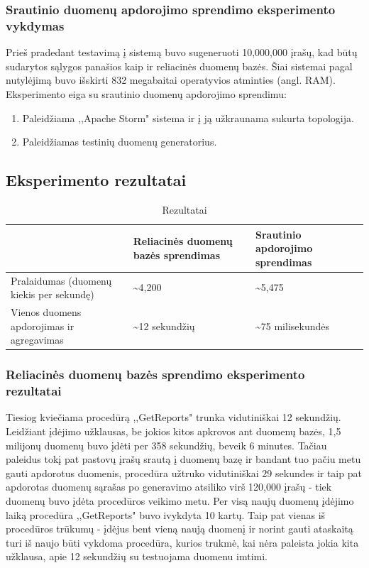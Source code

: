\documentclass{VUMIFPSkursinis}
\begin{document}
\subsubsection{Srautinio duomenų apdorojimo sprendimo eksperimento vykdymas}

Prieš pradedant testavimą į sistemą buvo sugeneruoti 10,000,000 įrašų, kad būtų sudarytos sąlygos panašios kaip ir reliacinės duomenų bazės.
Šiai sistemai pagal nutylėjimą buvo išskirti 832 megabaitai operatyvios atminties (angl. RAM). 
Eksperimento eiga su srautinio duomenų apdorojimo sprendimu:
\begin{enumerate} 
\item Paleidžiama ,,Apache Storm" sistema ir į ją užkraunama sukurta topologija.
\item Paleidžiamas testinių duomenų generatorius.
\end{enumerate}
\newpage
\subsection{Eksperimento rezultatai}
\begin{table}[!htbp]
    \begin{center}
        \caption{Rezultatai}
        \label{table:results}
        \begin{tabular}{ | l | p{4cm} | p{3cm} | } 
            \hline
              & Reliacinės duomenų bazės sprendimas & Srautinio apdorojimo sprendimas \\* \hline
            Pralaidumas (duomenų kiekis per sekundę) & \textasciitilde4,200 & \textasciitilde5,475 \\* \hline
            Vienos duomens apdorojimas ir agregavimas  & \textasciitilde12 sekundžių & \textasciitilde75 milisekundės\\* \hline
        \end{tabular}
    \end{center}
\end{table}\par
\subsubsection{Reliacinės duomenų bazės sprendimo eksperimento rezultatai}
Tiesiog kviečiama procedūrą ,,GetReports" trunka vidutiniškai 12 sekundžių. Leidžiant įdėjimo užklausas, be jokios kitos apkrovos ant duomenų bazės, 1,5 milijonų duomenų
buvo įdėti per 358 sekundžių, beveik 6 minutes. Tačiau paleidus tokį pat pastovų įrašų srautą į duomenų bazę ir bandant tuo pačiu metu gauti apdorotus duomenis,
procedūra užtruko vidutiniškai 29 sekundes ir taip pat apdorotas duomenų sąrašas po generavimo atsiliko virš 120,000 įrašų - tiek duomenų buvo įdėta procedūros veikimo metu. 
Per visą naujų duomenų įdėjimo laiką procedūra ,,GetReports" buvo ivykdyta 10 kartų.
Taip pat vienas iš procedūros trūkumų - įdėjus bent vieną naują duomenį ir norint gauti ataskaitą turi iš naujo būti vykdoma procedūra, kurios trukmė, kai nėra 
paleista jokia kita užklausa, apie 12 sekundžių su testuojama duomenu imtimi.
\end{document}
